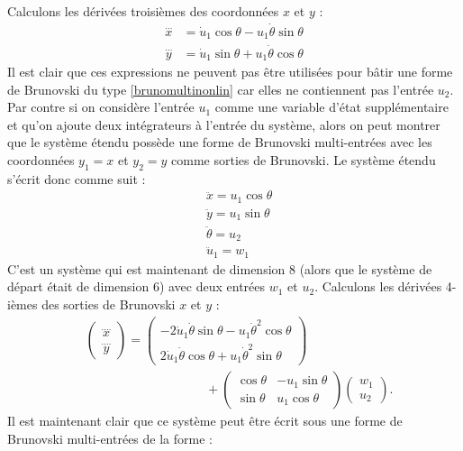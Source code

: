Calculons les dérivées troisièmes des coordonnées $x$ et $y$ :
\begin{align*}
\stackrel{\dots}{x} &= \dot u_1 \cos \theta - u_1 \dot \theta \sin \theta \\
\stackrel{\dots}{y} &= \dot u_1 \sin \theta + u_1 \dot \theta \cos \theta
\end{align*}
Il est clair que ces expressions ne peuvent pas être utilisées pour bâtir une forme de Brunovski du type \eqref{brunomultinonlin} car elles ne contiennent pas l'entrée $u_2$. Par contre si on considère l'entrée $u_1$ comme une variable d'état supplémentaire et qu'on ajoute deux intégrateurs à l'entrée du système, alors on peut montrer que le système étendu possède une forme de Brunovski multi-entrées avec les coordonnées $y_1 = x$ et $y_2 = y$ comme sorties de Brunovski. Le système étendu s'écrit donc comme suit :
\begin{align} \label{etendufusee}
&\ddot x = u_1 \cos \theta \nonumber \\
&\ddot y = u_1 \sin \theta \nonumber \\
&\ddot \theta = u_2 \\
&\ddot u_1 = w_1 \nonumber
\end{align}
C'est un système qui est maintenant de dimension 8 (alors que le système de départ était de dimension 6) avec deux entrées $w_1$ et $u_2$. Calculons les dérivées 4-ièmes des sorties de Brunovski $x$ et $y$ :
\begin{align}
&\left(\begin{array}{c}\stackrel{....}{x} \\ \stackrel{....}{y} \end{array}\right) = \left(\begin{array}{c}-2\dot u_1 \dot \theta \sin \theta - u_1 \dot \theta^2 \cos \theta 
 \\ 2\dot u_1 \dot \theta \cos \theta + u_1 \dot \theta^2 \sin \theta\end{array}\right) \nonumber \\
&\hspace{4cm} + \left(\begin{array}{cc}\cos \theta & -u_1 \sin \theta \\\sin \theta & u_1 \cos \theta\end{array}\right)\left(\begin{array}{c}w_1 \\u_2\end{array}\right). \label{brunofusee}
\end{align}
Il est maintenant clair que ce système peut être écrit sous une forme de Brunovski multi-entrées de la forme :
